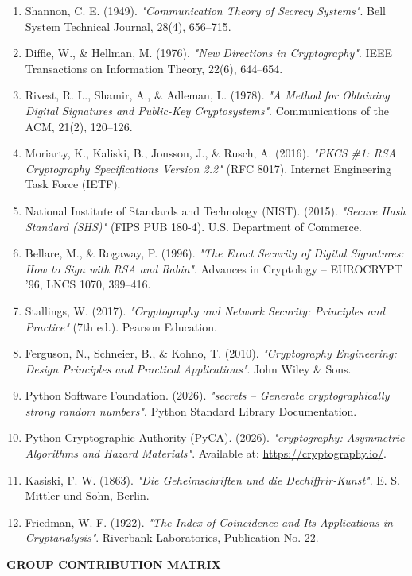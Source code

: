 \documentclass[12pt,a4paper]{report}
\begin{document}
\begin{enumerate}
    \item Shannon, C. E. (1949). \textit{"Communication Theory of Secrecy Systems"}. Bell System Technical Journal, 28(4), 656--715.
    \item Diffie, W., \& Hellman, M. (1976). \textit{"New Directions in Cryptography"}. IEEE Transactions on Information Theory, 22(6), 644--654.
    \item Rivest, R. L., Shamir, A., \& Adleman, L. (1978). \textit{"A Method for Obtaining Digital Signatures and Public-Key Cryptosystems"}. Communications of the ACM, 21(2), 120--126.
    \item Moriarty, K., Kaliski, B., Jonsson, J., \& Rusch, A. (2016). \textit{"PKCS \#1: RSA Cryptography Specifications Version 2.2"} (RFC 8017). Internet Engineering Task Force (IETF).
    \item National Institute of Standards and Technology (NIST). (2015). \textit{"Secure Hash Standard (SHS)"} (FIPS PUB 180-4). U.S. Department of Commerce.
    \item Bellare, M., \& Rogaway, P. (1996). \textit{"The Exact Security of Digital Signatures: How to Sign with RSA and Rabin"}. Advances in Cryptology -- EUROCRYPT '96, LNCS 1070, 399--416.
    \item Stallings, W. (2017). \textit{"Cryptography and Network Security: Principles and Practice"} (7th ed.). Pearson Education.
    \item Ferguson, N., Schneier, B., \& Kohno, T. (2010). \textit{"Cryptography Engineering: Design Principles and Practical Applications"}. John Wiley \& Sons.
    \item Python Software Foundation. (2026). \textit{"secrets -- Generate cryptographically strong random numbers"}. Python Standard Library Documentation.
    \item Python Cryptographic Authority (PyCA). (2026). \textit{"cryptography: Asymmetric Algorithms and Hazard Materials"}. Available at: \url{https://cryptography.io/}.
    \item Kasiski, F. W. (1863). \textit{"Die Geheimschriften und die Dechiffrir-Kunst"}. E. S. Mittler und Sohn, Berlin.
    \item Friedman, W. F. (1922). \textit{"The Index of Coincidence and Its Applications in Cryptanalysis"}. Riverbank Laboratories, Publication No. 22.
\end{enumerate}

\newpage

\begin{center}
    {\fontsize{14}{16}\bfseries GROUP CONTRIBUTION MATRIX}\\[1.5em]
\end{center}
\end{document}
